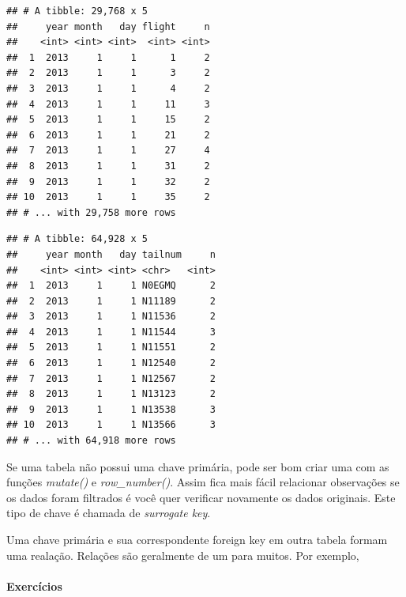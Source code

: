 \documentclass[
]{article}
\newenvironment{Shaded}{\begin{snugshade}}{\end{snugshade}}
\newcommand{\DecValTok}[1]{\textcolor[rgb]{0.00,0.00,0.81}{#1}}
\newcommand{\KeywordTok}[1]{\textcolor[rgb]{0.13,0.29,0.53}{\textbf{#1}}}
\newcommand{\NormalTok}[1]{#1}
\newcommand{\OperatorTok}[1]{\textcolor[rgb]{0.81,0.36,0.00}{\textbf{#1}}}
\newcommand{\StringTok}[1]{\textcolor[rgb]{0.31,0.60,0.02}{#1}}
\begin{document}
\begin{verbatim}
## # A tibble: 29,768 x 5
##     year month   day flight     n
##    <int> <int> <int>  <int> <int>
##  1  2013     1     1      1     2
##  2  2013     1     1      3     2
##  3  2013     1     1      4     2
##  4  2013     1     1     11     3
##  5  2013     1     1     15     2
##  6  2013     1     1     21     2
##  7  2013     1     1     27     4
##  8  2013     1     1     31     2
##  9  2013     1     1     32     2
## 10  2013     1     1     35     2
## # ... with 29,758 more rows
\end{verbatim}

\begin{Shaded}
\end{Shaded}

\begin{verbatim}
## # A tibble: 64,928 x 5
##     year month   day tailnum     n
##    <int> <int> <int> <chr>   <int>
##  1  2013     1     1 N0EGMQ      2
##  2  2013     1     1 N11189      2
##  3  2013     1     1 N11536      2
##  4  2013     1     1 N11544      3
##  5  2013     1     1 N11551      2
##  6  2013     1     1 N12540      2
##  7  2013     1     1 N12567      2
##  8  2013     1     1 N13123      2
##  9  2013     1     1 N13538      3
## 10  2013     1     1 N13566      3
## # ... with 64,918 more rows
\end{verbatim}

Se uma tabela não possui uma chave primária, pode ser bom criar uma com
as funções \emph{mutate()} e \emph{row\_number()}. Assim fica mais fácil
relacionar observações se os dados foram filtrados é você quer verificar
novamente os dados originais. Este tipo de chave é chamada de
\emph{surrogate key}.

Uma chave primária e sua correspondente foreign key em outra tabela
formam uma realação. Relações são geralmente de um para muitos. Por
exemplo,

\hypertarget{exercuxedcios-1}{%
\paragraph{Exercícios}\label{exercuxedcios-1}}
\end{document}
